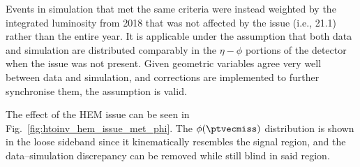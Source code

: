 \medskip

\noindent{}Events in simulation that met the same criteria were instead weighted by the integrated luminosity from 2018 that was not affected by the issue (i.e., 21.1\fbinv) rather than the entire year. It is applicable under the assumption that both data and simulation are distributed comparably in the $\eta-\phi$ portions of the detector when the issue was not present. Given geometric variables agree very well between data and simulation, and corrections are implemented to further synchronise them, the assumption is valid.

The effect of the HEM issue can be seen in Fig.~\ref{fig:htoinv_hem_issue_met_phi}. The $\phi(\ptvecmiss)$ distribution is shown in the loose \omegaTilde sideband since it kinematically resembles the signal region, and the data--simulation discrepancy can be removed while still blind in said region.

